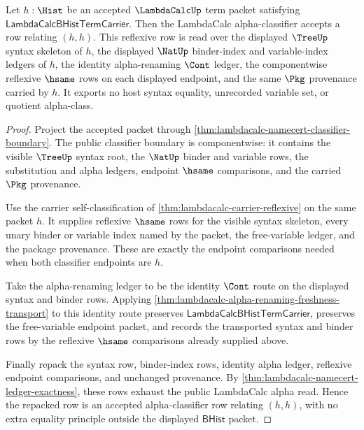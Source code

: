 \begin{theorem}
\label{thm:lambdacalc-alpha-classifier-reflexive}
Let $h:\Hist$ be an accepted $\LambdaCalcUp$ term packet satisfying
$\mathsf{LambdaCalcBHistTermCarrier}$. Then the LambdaCalc alpha-classifier
accepts a row relating $(h,h)$. This reflexive row is read over the displayed
$\TreeUp$ syntax skeleton of $h$, the displayed $\NatUp$ binder-index and
variable-index ledgers of $h$, the identity alpha-renaming $\Cont$ ledger, the
componentwise reflexive $\hsame$ rows on each displayed endpoint, and the same
$\Pkg$ provenance carried by $h$. It exports no host syntax equality, unrecorded
variable set, or quotient alpha-class.
\end{theorem}
\begin{proof}
Project the accepted packet through
\autoref{thm:lambdacalc-namecert-classifier-boundary}. The public classifier
boundary is componentwise: it contains the visible $\TreeUp$ syntax root, the
$\NatUp$ binder and variable rows, the substitution and alpha ledgers, endpoint
$\hsame$ comparisons, and the carried $\Pkg$ provenance.

Use the carrier self-classification of \autoref{thm:lambdacalc-carrier-reflexive}
on the same packet $h$. It supplies reflexive $\hsame$ rows for the visible
syntax skeleton, every unary binder or variable index named by the packet, the
free-variable ledger, and the package provenance. These are exactly the
endpoint comparisons needed when both classifier endpoints are $h$.

Take the alpha-renaming ledger to be the identity $\Cont$ route on the displayed
syntax and binder rows. Applying
\autoref{thm:lambdacalc-alpha-renaming-freshness-transport} to this identity
route preserves $\mathsf{LambdaCalcBHistTermCarrier}$, preserves the
free-variable endpoint packet, and records the transported syntax and binder
rows by the reflexive $\hsame$ comparisons already supplied above.

Finally repack the syntax row, binder-index rows, identity alpha ledger,
reflexive endpoint comparisons, and unchanged provenance. By
\autoref{thm:lambdacalc-namecert-ledger-exactness}, these rows exhaust the
public LambdaCalc alpha read. Hence the repacked row is an accepted
alpha-classifier row relating $(h,h)$, with no extra equality principle outside
the displayed $\mathsf{BHist}$ packet.
\end{proof}
